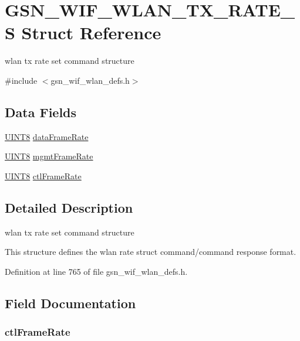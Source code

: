 \hypertarget{a00409}{
\section{GSN\_\-WIF\_\-WLAN\_\-TX\_\-RATE\_\-S Struct Reference}
\label{a00409}
}


wlan tx rate set command structure  




{\ttfamily \#include $<$gsn\_\-wif\_\-wlan\_\-defs.h$>$}

\subsection*{Data Fields}
\begin{DoxyCompactItemize}
\item 
\hyperlink{a00660_gab27e9918b538ce9d8ca692479b375b6a}{UINT8} \hyperlink{a00409_acfcf913585542d61df9a4a9f7086decf}{dataFrameRate}
\item 
\hyperlink{a00660_gab27e9918b538ce9d8ca692479b375b6a}{UINT8} \hyperlink{a00409_aa827f7462c7eec42efd9a93314d01fed}{mgmtFrameRate}
\item 
\hyperlink{a00660_gab27e9918b538ce9d8ca692479b375b6a}{UINT8} \hyperlink{a00409_abbd75e69142c1e05638c274c0d152815}{ctlFrameRate}
\end{DoxyCompactItemize}


\subsection{Detailed Description}
wlan tx rate set command structure 

This structure defines the wlan rate struct command/command response format. 

Definition at line 765 of file gsn\_\-wif\_\-wlan\_\-defs.h.



\subsection{Field Documentation}
\hypertarget{a00409_abbd75e69142c1e05638c274c0d152815}{
\subsubsection[{ctlFrameRate}]{ {\bf ctlFrameRate}}}
\label{a00409_abbd75e69142c1e05638c274c0d152815}



